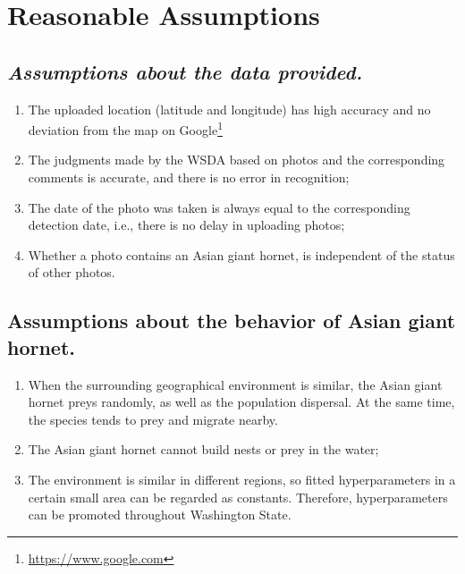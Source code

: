 \documentclass[../mcmpaper]{subfiles}
\begin{document}
	\section{Reasonable Assumptions}
	\subsection*{\itshape Assumptions about the data provided.}
    \begin{enumerate}[left=0pt .. \parindent]
        \item The uploaded location (latitude and longitude) has high accuracy and no deviation from the map on Google\footnote{\url{https://www.google.com}}
        \item The judgments made by the WSDA based on photos and the corresponding comments is accurate, and there is no error in recognition;
        \item The date of the photo was taken is always equal to the corresponding detection date, i.e., there is no delay in uploading photos;
        \item Whether a photo contains an Asian giant hornet, is independent of the status of other photos.
    \end{enumerate}
    \subsection*{Assumptions about the behavior of Asian giant hornet.}
    \begin{enumerate}[left=0pt .. \parindent]
        \item When the surrounding geographical environment is similar, the Asian giant hornet preys randomly, as well as the population dispersal. At the same time, the species tends to prey and migrate nearby.
        \item The Asian giant hornet cannot build nests or prey in the water;
        \item The environment is similar in diﬀerent regions, so fitted hyperparameters in a certain small area can be regarded as constants. Therefore, hyperparameters can be promoted throughout Washington State.
    \end{enumerate}
\end{document}
